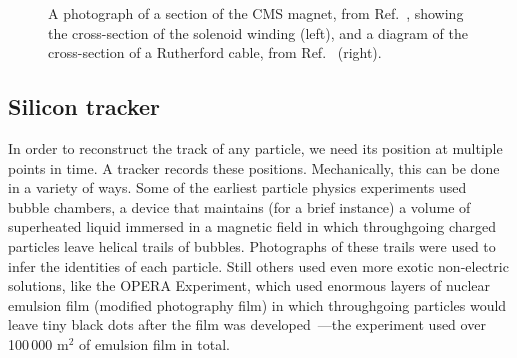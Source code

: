 \begin{figure}[htb]
    \centering
    \quad
    \caption[A photograph of a section of the CMS magnet and a diagram of the cross-section of a Rutherford cable.]{
        A photograph of a section of the CMS magnet, from Ref.~\cite{CourierSolenoid}, showing the cross-section of the solenoid winding (left), and a diagram of the cross-section of a Rutherford cable, from Ref.~\cite{CERN-LHCC-97-010} (right). 
    }
    \label{fig:cms_magnet}
\end{figure}

\subsection{Silicon tracker}
In order to reconstruct the track of any particle, we need its position at multiple points in time. 
A tracker records these positions. 
Mechanically, this can be done in a variety of ways. 
Some of the earliest particle physics experiments used bubble chambers, a device that maintains (for a brief instance) a volume of superheated liquid immersed in a magnetic field in which throughgoing charged particles leave helical trails of bubbles. 
Photographs of these trails were used to infer the identities of each particle. 
Still others used even more exotic non-electric solutions, like the OPERA Experiment, which used enormous layers of nuclear emulsion film (modified photography film) in which throughgoing particles would leave tiny black dots after the film was developed\footnotemark{}~\cite{Acquafredda:2009zz}---the experiment used over 100\,000 m$^2$ of emulsion film in total. 


